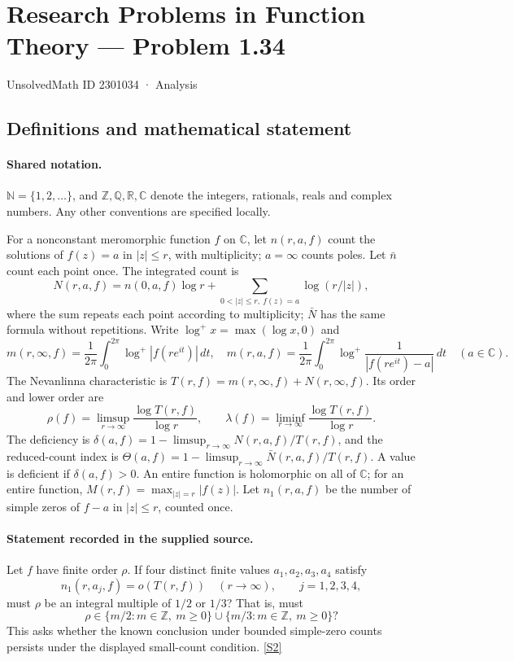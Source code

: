 \documentclass[11pt]{article}
\newcommand{\sref}[2]{\hyperlink{source:#1:#2}{[S#2]}}
\begin{document}
\setcounter{section}{2301033}
\section{Research Problems in Function Theory — Problem 1.34}\label{2301034}
{\small\sffamily UnsolvedMath ID 2301034 · Analysis}
\subsection{Definitions and mathematical statement}

\paragraph{Shared notation.}$\mathbb N=\{1,2,\ldots\}$, and $\mathbb Z,\mathbb Q,\mathbb R,\mathbb C$ denote the integers, rationals, reals and complex numbers. Any other conventions are specified locally.


For a nonconstant meromorphic function $f$ on $\mathbb C$, let $n(r,a,f)$ count the solutions of $f(z)=a$ in $|z|\le r$, with multiplicity; $a=\infty$ counts poles. Let $\bar n$ count each point once. The integrated count is
\[
 N(r,a,f)=n(0,a,f)\log r+\sum_{0<|z|\le r,\ f(z)=a}\log(r/|z|),
\]
where the sum repeats each point according to multiplicity; $\bar N$ has the same formula without repetitions. Write $\log^+x=\max(\log x,0)$ and
\[
 m(r,\infty,f)=\frac1{2\pi}\int_0^{2\pi}\log^+|f(re^{it})|\,dt,\quad
 m(r,a,f)=\frac1{2\pi}\int_0^{2\pi}\log^+\frac1{|f(re^{it})-a|}\,dt\quad(a\in\mathbb C).
\]
The Nevanlinna characteristic is $T(r,f)=m(r,\infty,f)+N(r,\infty,f)$. Its order and lower order are
\[
 \rho(f)=\limsup_{r\to\infty}\frac{\log T(r,f)}{\log r},\qquad
 \lambda(f)=\liminf_{r\to\infty}\frac{\log T(r,f)}{\log r}.
\]
The deficiency is $\delta(a,f)=1-\limsup_{r\to\infty}N(r,a,f)/T(r,f)$, and the reduced-count index is $\Theta(a,f)=1-\limsup_{r\to\infty}\bar N(r,a,f)/T(r,f)$. A value is deficient if $\delta(a,f)>0$. An entire function is holomorphic on all of $\mathbb C$; for an entire function, $M(r,f)=\max_{|z|=r}|f(z)|$. Let $n_1(r,a,f)$ be the number of simple zeros of $f-a$ in $|z|\le r$, counted once.
\paragraph{Statement recorded in the supplied source.}
Let $f$ have finite order $\rho$. If four distinct finite values $a_1,a_2,a_3,a_4$ satisfy
\[
 n_1(r,a_j,f)=o(T(r,f))\quad(r\to\infty),\qquad j=1,2,3,4,
\]
must $\rho$ be an integral multiple of $1/2$ or $1/3$? That is, must
\[
 \rho\in\{m/2:m\in\mathbb Z,\ m\ge0\}\cup\{m/3:m\in\mathbb Z,\ m\ge0\}?
\]
This asks whether the known conclusion under bounded simple-zero counts persists under the displayed small-count condition. \sref{2301034}{2}
\end{document}
